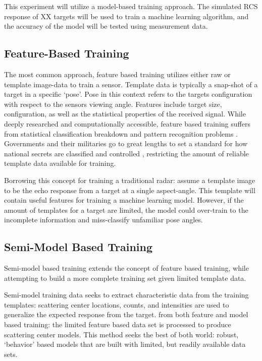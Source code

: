 	This experiment will utilize a model-based training approach. The simulated RCS response of XX targets will be used to train a machine learning algorithm, and the accuracy of the model will be tested using measurement data.

	\subsection{Feature-Based Training}
		The most common approach, feature based training utilizes either raw or template image-data to train a sensor. Template data is typically a snap-shot of a target in a specific `pose'. Pose in this context refers to the targets configuration with respect to the sensors viewing angle. Features include target size, configuration, as well as the statistical properties of the received signal.  While deeply researched and computationally accessible, feature based training suffers from statistical classification breakdown and pattern recognition problems \cite{SAR_Survey}. Governments and their militaries go to great lengths to set a standard for how national secrets are classified and controlled \cite{EO_10290}\cite{PLA_Class}, restricting the amount of reliable template data available for training.

		Borrowing this concept for training a traditional radar:  assume a template image to be the echo response from a target at a single aspect-angle. This template will contain useful features for training a machine learning model. However, if the amount of templates for a target are limited, the model could over-train to the incomplete information and miss-classify unfamiliar pose angles.

	\subsection{Semi-Model Based Training}
		Semi-model based training extends the concept of feature based training, while attempting to build a more complete training set given limited template data.

		Semi-model training data seeks to extract characteristic data from the training templates:  scattering center locations, counts, and intensities are used to generalize the expected response from the target. from both feature and model based training: the limited feature based data set is processed to produce scattering center models. This method seeks the best of both world:  robust, `behavior' based models that are built with limited, but readily available data sets.


